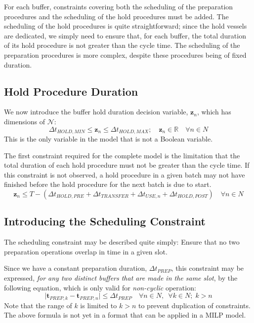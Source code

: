 For each buffer, constraints covering both the scheduling of the preparation
procedures and the scheduling of the hold procedures must be added.
The scheduling of the hold procedures is quite straightforward; since the hold
vessels are dedicated, we simply need to ensure that, for each buffer, the
total duration of its hold procedure is not greater than the cycle time.
The scheduling of the preparation procedures is more complex, despite these
procedures being of fixed duration.

\subsection{Hold Procedure Duration}\label{SS.constr5}

We now introduce the buffer hold duration decision variable, 
$\boldsymbol{z}_{n}$, which has dimensions of $\mathcal{N}$:
\begin{equation}
    \Delta t_{\mathit{HOLD,MIN}} \le \boldsymbol{z}_{n} \le 
    \Delta t_{\mathit{HOLD,MAX}}; \quad
    \boldsymbol{z}_{n} \in \mathbb{R} \quad \forall n \in N
    \label{eq.z}
\end{equation}
This is the only variable in the model that is not a Boolean variable.

The first constraint required for the complete model is the limitation that the
total duration of each hold procedure must not be greater than the cycle time.
If this constraint is not observed, a hold procedure in a given batch may not
have finished before the hold procedure for the next batch is due to start.
\begin{equation}
    \boldsymbol{z}_{n} \le T - \left( \Delta t_{\mathit{HOLD,PRE}} +
    \Delta t_{\mathit{TRANSFER}} + \Delta t_{\mathit{USE},n} + \Delta
    t_{\mathit{HOLD,POST}} \right) \quad \forall n \in N
    \label{eq.z1}
\end{equation}

\subsection{Introducing the Scheduling Constraint}\label{SS.schedintro}

The scheduling constraint may be described quite simply:
Ensure that no two preparation operations overlap in time in a given slot.

Since we have a constant preparation duration, 
$\Delta t_{\mathit{PREP}}$, this constraint may be expressed, 
\emph{for any two distinct buffers that are made in the same slot}, by the
following equation, which is only valid for \emph{non-cyclic} operation:
\begin{equation}
    \lvert \boldsymbol{t}_{\mathit{PREP},k} - \boldsymbol{t}_{\mathit{PREP},n}
    \rvert \le \Delta t_{\mathit{PREP}} \quad \forall n \in N, \enspace
    \forall k \in N; \; k > n
\end{equation}
Note that the range of $ k $ is limited to $ k > n $ to prevent duplication
of constraints.
The above formula is not yet in a format that can be applied in a MILP model.

